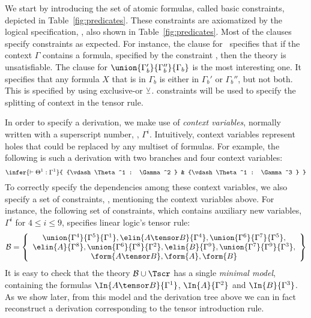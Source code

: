 We start by introducing the set of atomic formulas, called basic
constraints, depicted in Table~\ref{fig:predicates}. These 
constraints are axiomatized by the logical specification, \thSeq, also
shown in Table~\ref{fig:predicates}. Most of the clauses specify
constraints as expected.
For instance, the clause for \emp{\Gamma}\ specifies that
if the context $\Gamma$ contains a formula, specified by the constraint
, then the theory is unsatisfiable. The clause for
$\union{\Gamma_b'}{\Gamma_b''}{\Gamma_b}$ is the most interesting one. It
specifies that any formula $X$ that is in $\Gamma_b$ is either in
$\Gamma_b'$ or $\Gamma_b''$, but not both. This is specified by using
exclusive-or $\veebar$.  constraints will be used to specify the
splitting of context in the tensor rule. 

In order to specify a derivation, we make use of \emph{context variables},
normally written with a superscript number, \eg, $\Gamma^i$. Intuitively,
context variables represent holes that could be replaced by 
any multiset of formulas. For example, the following
is such a derivation with two branches and four context variables:
{\small
\[
\infer{\vdash \Theta^1 : \Gamma^1 }
{
{\vdash \Theta^1 : \Gamma^2  }
&
{\vdash \Theta^1 : \Gamma^3  }
}
\]
}
To correctly specify the dependencies
among these context variables, we also specify a set of constraints,
\groundSet, mentioning the context variables above.
For instance, the following set of constraints, which
contains auxiliary new variables, $\Gamma^{i}$ for $4 \leq i \leq 9$,
specifies linear logic's tensor rule:
{\small
\[
\groundSet = \left\{
\begin{array}{c}
\union{\Gamma^4}{\Gamma^5}{\Gamma^1},
\elin{A \tensor B}{\Gamma^4}, \union{\Gamma^6}{\Gamma^7}{\Gamma^5}, \\
\elin{A}{\Gamma^8}, \union{\Gamma^6}{\Gamma^8}{\Gamma^2},
\elin{B}{\Gamma^9}, \union{\Gamma^7}{\Gamma^9}{\Gamma^3}, \\
\form{A \tensor B}, \form{A}, \form{B}
\end{array}\right\}
\]
}
It is easy to check that the theory $\groundSet \cup \thSeq$ has a single
\emph{minimal model}, containing the formulas $\In{A \tensor B}{\Gamma^1}$,
$\In{A}{\Gamma^2}$ and $\In{B}{\Gamma^3}$. As we show later, from this
model and the derivation tree above we can in fact reconstruct a
derivation corresponding to the tensor introduction rule. 


